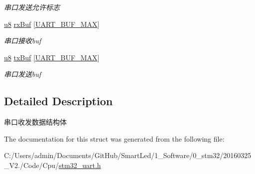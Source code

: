 \begin{DoxyCompactItemize}
\begin{DoxyCompactList}\small\item\em 串口发送允许标志 \end{DoxyCompactList}\item 
\hypertarget{struct_s_t_r___uart_ad29041e59f38e3be64badd3e62b69931}{\hyperlink{group___b_s_p_gaed742c436da53c1080638ce6ef7d13de}{u8} \hyperlink{struct_s_t_r___uart_ad29041e59f38e3be64badd3e62b69931}{rx\-Buf} \mbox{[}\hyperlink{group___u_a_r_t_ga24372e8f343b57a91bf48cdd2fd4a5dd}{\-U\-A\-R\-T\-\_\-\-B\-U\-F\-\_\-\-M\-A\-X}\mbox{]}}\label{struct_s_t_r___uart_ad29041e59f38e3be64badd3e62b69931}

\begin{DoxyCompactList}\small\item\em 串口接收buf \end{DoxyCompactList}\item 
\hypertarget{struct_s_t_r___uart_af6d84fa47f986f531e35ae379d7a6a3c}{\hyperlink{group___b_s_p_gaed742c436da53c1080638ce6ef7d13de}{u8} \hyperlink{struct_s_t_r___uart_af6d84fa47f986f531e35ae379d7a6a3c}{tx\-Buf} \mbox{[}\hyperlink{group___u_a_r_t_ga24372e8f343b57a91bf48cdd2fd4a5dd}{\-U\-A\-R\-T\-\_\-\-B\-U\-F\-\_\-\-M\-A\-X}\mbox{]}}\label{struct_s_t_r___uart_af6d84fa47f986f531e35ae379d7a6a3c}

\begin{DoxyCompactList}\small\item\em 串口发送buf \end{DoxyCompactList}\end{DoxyCompactItemize}


\subsection{\-Detailed \-Description}
串口收发数据结构体 

\-The documentation for this struct was generated from the following file\-:\begin{DoxyCompactItemize}
\item 
\-C\-:/\-Users/admin/\-Documents/\-Git\-Hub/\-Smart\-Led/1\-\_\-\-Software/0\-\_\-stm32/20160325\-\_\-\-V2./\-Code/\-Cpu/\hyperlink{stm32__uart_8h}{stm32\-\_\-uart.\-h}\end{DoxyCompactItemize}

